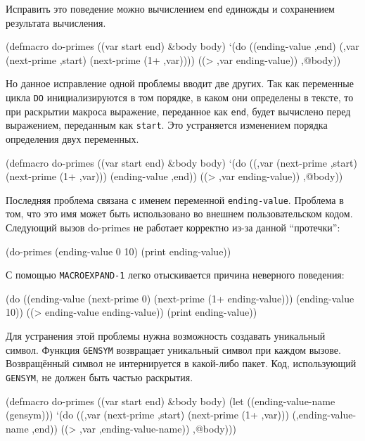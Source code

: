 Исправить это поведение можно вычислением \lstinline{end} единожды и сохранением результата вычисления.
\begin{cllst}{}{}
(defmacro do-primes ((var start end) &body body)
  `(do ((ending-value ,end)
        (,var (next-prime ,start) (next-prime (1+ ,var))))
       ((> ,var ending-value))
     ,@body))
\end{cllst}

Но данное исправление одной проблемы вводит две других.
Так как переменные цикла \lstinline{DO} инициализируются в том порядке, в каком они определены в тексте, то при раскрытии макроса выражение, переданное как \lstinline{end}, будет вычислено перед выражением, переданным как \lstinline{start}. Это устраняется изменением порядка определения двух переменных.
\begin{cllst}{}{}
(defmacro do-primes ((var start end) &body body)
  `(do ((,var (next-prime ,start) (next-prime (1+ ,var)))
        (ending-value ,end))
       ((> ,var ending-value))
     ,@body))
\end{cllst}

Последняя проблема связана с именем переменной \lstinline{ending-value}. Проблема в том, что это имя может быть использовано во внешнем пользовательском кодом. Следующий вызов do-primes не работает корректно из-за данной ``протечки'':
\begin{cllst}{}{}
(do-primes (ending-value 0 10)
  (print ending-value))
\end{cllst}

С помощью \lstinline{MACROEXPAND-1} легко отыскивается причина неверного поведения:
\begin{cllst}{}{}
(do ((ending-value (next-prime 0) (next-prime (1+ ending-value)))
     (ending-value 10))
    ((> ending-value ending-value))
  (print ending-value))
\end{cllst}

Для устранения этой проблемы нужна возможность создавать уникальный символ. Функция \lstinline{GENSYM} возвращает уникальный символ при каждом вызове. Возвращённый символ не интернируется в какой-либо пакет. Код, использующий \lstinline{GENSYM}, не должен быть частью раскрытия.
\begin{cllst}{}{}
(defmacro do-primes ((var start end) &body body)
  (let ((ending-value-name (gensym)))
    `(do ((,var (next-prime ,start) (next-prime (1+ ,var)))
          (,ending-value-name ,end))
         ((> ,var ,ending-value-name))
       ,@body)))
\end{cllst}

